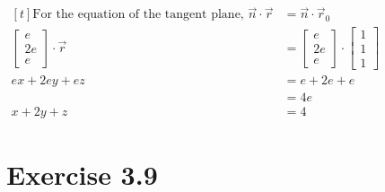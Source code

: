 \documentclass[11pt,fleqn]{book} %
\begin{document}
$\begin{aligned}[t]
    \text{For the equation of the tangent plane, }
    \vec{n} \cdot \vec{r}
     & = \vec{n} \cdot \vec{r}_0                                                                    \\
    \begin{bmatrix} e \\ 2e \\ e \end{bmatrix} \cdot \vec{r}
     & = \begin{bmatrix} e \\ 2e \\ e \end{bmatrix} \cdot \begin{bmatrix} 1 \\ 1 \\ 1 \end{bmatrix} \\
    ex + 2ey + ez
     & = e + 2e + e                                                                                 \\
     & = 4e                                                                                         \\
    x + 2y + z
     & = 4
\end{aligned}$

\section*{Exercise 3.9}
\end{document}
